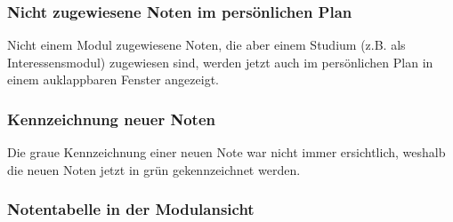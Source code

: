 \documentclass[a4paper,10pt]{scrartcl}
\begin{document}
\subsubsection*{Nicht zugewiesene Noten im persönlichen Plan}

Nicht einem Modul zugewiesene Noten, die aber einem Studium (z.B. als Interessensmodul) zugewiesen sind, werden jetzt auch im persönlichen Plan in einem auklappbaren Fenster angezeigt.

\noindent{}
\medskip

\subsubsection*{Kennzeichnung neuer Noten}

Die graue Kennzeichnung einer neuen Note war nicht immer ersichtlich, weshalb die neuen Noten jetzt in grün gekennzeichnet werden.

\noindent{}
\medskip

\subsubsection*{Notentabelle in der Modulansicht}
\end{document}
